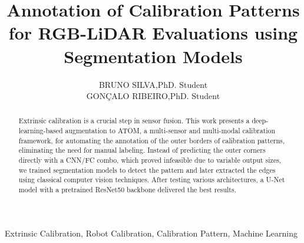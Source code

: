 \documentclass{ieeeaccess}
\begin{document}

\title{Annotation of Calibration Patterns for RGB-LiDAR Evaluations using Segmentation Models}
\author{\uppercase{Bruno Silva},PhD. Student\\
\uppercase{Gonçalo Ribeiro},PhD. Student}

\address[1]{Department of Mechanical Engineering, University of Aveiro}



\begin{abstract}

  Extrinsic calibration is a crucial step in sensor fusion. This work presents a deep-learning-based augmentation to ATOM, a
  multi-sensor and multi-modal calibration framework, for automating the annotation of the outer borders of calibration patterns,
  eliminating the need for manual labeling. Instead of predicting the outer corners directly with a CNN/FC combo, which proved
  infeasible due to variable output sizes, we trained segmentation models to detect the pattern and later extracted the edges using
classical computer vision techniques. After testing various architectures, a U-Net model with a pretrained ResNet50 backbone delivered
the best results. \end{abstract}

\begin{keywords}
Extrinsic Calibration, Robot Calibration, Calibration Pattern, Machine Learning
\end{keywords}

\titlepgskip=-21pt

\maketitle










\EOD
\end{document}
